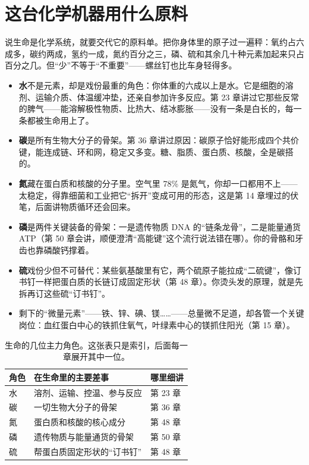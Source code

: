 \section{这台化学机器用什么原料}

说生命是化学系统，就要交代它的原料单。把你身体里的原子过一遍秤：氧约占六成多，碳约两成，氢约一成，氮约百分之三，磷、硫和其余几十种元素加起来只占百分之几。但“少”不等于“不重要”——螺丝钉也比车身轻得多。

\begin{itemize}[itemsep=2pt]
\item \textbf{水}不是元素，却是戏份最重的角色：你体重的六成以上是水。它是细胞的溶剂、运输介质、体温缓冲垫，还亲自参加许多反应。第 23 章讲过它那些反常的脾气——能溶解极性物质、比热大、结冰膨胀——没有一条是白长的，每一条都被生命用上了。
\item \textbf{碳}是所有生物大分子的骨架。第 36 章讲过原因：碳原子恰好能形成四个共价键，能连成链、环和网，稳定又多变。糖、脂质、蛋白质、核酸，全是碳搭的。
\item \textbf{氮}藏在蛋白质和核酸的分子里。空气里 78\% 是氮气，你却一口都用不上—— 太稳定，得靠细菌和工业把它“拆开”变成可用的形态，这是第 14 章埋过的伏笔，后面讲物质循环还会回来。
\item \textbf{磷}是两件关键装备的骨架：一是遗传物质 DNA 的“链条龙骨”，二是能量通货 ATP（第 50 章会讲，顺便澄清“高能键”这个流行说法错在哪）。你的骨骼和牙齿也靠磷酸钙撑着。
\item \textbf{硫}戏份少但不可替代：某些氨基酸里有它，两个硫原子能拉成“二硫键”，像订书钉一样把蛋白质的长链订成固定形状（第 48 章）。你烫头发的原理，就是先拆再订这些硫“订书钉”。
\item 剩下的“微量元素”——铁、锌、碘、镁……——总量微不足道，却各管一个关键岗位：血红蛋白中心的铁抓住氧气，叶绿素中心的镁抓住阳光（第 15 章）。
\end{itemize}

\begin{table}[htbp]
\centering
\begin{tabular}{lll}
\toprule
角色 & 在生命里的主要差事 & 哪里细讲 \\
\midrule
水 & 溶剂、运输、控温、参与反应 & 第 23 章 \\
碳 & 一切生物大分子的骨架 & 第 36 章 \\
氮 & 蛋白质和核酸的核心成分 & 第 48 章 \\
磷 & 遗传物质与能量通货的骨架 & 第 50 章 \\
硫 & 帮蛋白质固定形状的“订书钉” & 第 48 章 \\
\bottomrule
\end{tabular}
\caption{生命的几位主力角色。这张表只是索引，后面每一章展开其中一位。}
\end{table}

